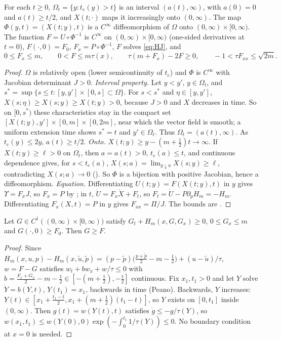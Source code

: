 \documentclass[11pt,a4paper]{report}
\begin{document}
\begin{proposition}\label{prop:global}
For each \(t\ge0\), \(\Omega_t=\{y:t_e(y)>t\}\) is an interval \((a(t),\infty)\), with \(a(0)=0\) and
\(a(t)\ge t/2\), and \(X(t;\cdot)\) maps it increasingly onto \((0,\infty)\). The map
\(\Phi(y,t)=(X(t;y),t)\) is a \(C^\infty\) diffeomorphism of \(\Omega\) onto \((0,\infty)\times[0,\infty)\).
The function \(F=U\circ\Phi^{-1}\) is \(C^\infty\) on \((0,\infty)\times[0,\infty)\) (one-sided derivatives
at \(t=0\)), \(F(\cdot,0)=F_0\), \(F_x=P\circ\Phi^{-1}\), \(F\) solves \eqref{eq:HJ}, and
\[
0\le F_x\le m,\qquad 0<F\le m\tau(x),\qquad \tau(m+F_x)-2F\ge0,\qquad -1<\tau F_{xx}\le\sqrt{2m}.
\]
\end{proposition}
\begin{proof}
\(\Omega\) is relatively open (lower semicontinuity of \(t_e\)) and \(\Phi\) is \(C^\infty\) with Jacobian
determinant \(J>0\). \emph{Interval property.} Let \(y<y'\), \(y\in\Omega_t\), and
\(s^*=\sup\{s\le t:[y,y']\times[0,s]\subset\Omega\}\). For \(s<s^*\) and \(\eta\in[y,y']\),
\(X(s;\eta)\ge X(s;y)\ge X(t;y)>0\), because \(J>0\) and \(X\) decreases in time. So on \([0,s^*)\) these
characteristics stay in the compact set \([X(t;y),y']\times[0,m]\times[0,2m]\), near which the vector field is
smooth; a uniform extension time shows \(s^*=t\) and \(y'\in\Omega_t\). Thus \(\Omega_t=(a(t),\infty)\). As
\(t_e(y)\le2y\), \(a(t)\ge t/2\). \emph{Onto.} \(X(t;y)\ge y-(m+\frac12)t\to\infty\). If \(X(t;y)\ge\ell>0\) on
\(\Omega_t\), then \(a=a(t)>0\), \(t_e(a)\le t\), and continuous dependence gives, for \(s<t_e(a)\),
\(X(s;a)=\lim_{y\downarrow a}X(s;y)\ge\ell\), contradicting \(X(s;a)\to0\) (). So
\(\Phi\) is a bijection with positive Jacobian, hence a diffeomorphism. \emph{Equation.} Differentiating
\(U(t;y)=F(X(t;y),t)\) in \(y\) gives \(\Upsilon=F_xJ\), so \(F_x=P\) by ; in \(t\),
\(\dot U=F_x\dot X+F_t\), so \(F_t=\dot U-P\partial_pH_m=-H_m\). Differentiating \(F_x(X,t)=P\) in \(y\)
gives \(F_{xx}=\Pi/J\). The bounds are .
\end{proof}

\begin{lemma}[comparison]\label{lem:comparison}
Let \(G\in C^1((0,\infty)\times[0,\infty))\) satisfy \(G_t+H_m(x,G,G_x)\ge0\), \(0\le G_x\le m\) and
\(G(\cdot,0)\ge F_0\). Then \(G\ge F\).
\end{lemma}
\begin{proof}
Since \(H_m(x,u,p)-H_m(x,\tilde u,\tilde p)=(p-\tilde p)\bigl(\frac{p+\tilde p}2-m-\frac12\bigr)+(u-\tilde u)/\tau\),
\(w=F-G\) satisfies \(w_t+bw_x+w/\tau\le0\) with \(b=\frac{F_x+G_x}2-m-\frac12\in[-(m+\frac12),-\frac12]\)
continuous. Fix \(x_1,t_1>0\) and let \(Y\) solve \(\dot Y=b(Y,t)\), \(Y(t_1)=x_1\), backwards in time
(Peano). Backwards, \(Y\) increases: \(Y(t)\in[x_1+\frac{t_1-t}2,x_1+(m+\frac12)(t_1-t)]\), so \(Y\) exists
on \([0,t_1]\) inside \((0,\infty)\). Then \(g(t)=w(Y(t),t)\) satisfies \(\dot g\le-g/\tau(Y)\), so
\(w(x_1,t_1)\le w(Y(0),0)\exp(-\int_0^{t_1}1/\tau(Y))\le0\). No boundary condition at \(x=0\) is needed.
\end{proof}
\end{document}
